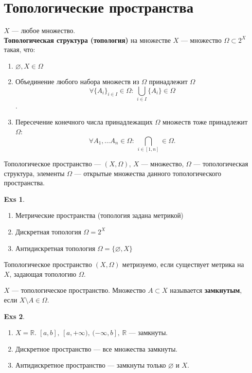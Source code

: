 \documentclass[11pt]{book}
\newcommand{\R}{\mathbb{R}}
\theoremstyle{definition}
\theoremstyle{plain}
\theoremstyle{plain}
\theoremstyle{definition}
\newtheorem*{exs}{Exs}
\theoremstyle{remark}
\begin{document}
\section{Топологические пространства}
\begin{defn}
    $ X$ --- любое множество. \\
    {\bf Топологическая структура (топология)} на множестве $ X$ --- множество  $ \Omega \subset 2^{X}$ такая, что:
    \begin{enumerate}
	\item $ \varnothing, X \in \Omega $
	\item Объединение любого набора множеств из $ \Omega $ принадлежит $ \Omega $
	    $$ \forall \{A_i\}_{i \in I} \in  \Omega : ~ \bigcup_{i \in  I}\{A_i\} \in \Omega  $$.
	\item Пересечение конечного числа принадлежащих $ \Omega $ множеств тоже принадлежит $ \Omega $:
	    \[
		\forall A_1, \ldots A_n \in \Omega : ~ \bigcap_{i \in [1, n]} \in \Omega
	    .\]
    \end{enumerate}
    Топологическое пространство --- $ (X, \Omega )$,
    $ X $ --- множество,  $ \Omega $ --- топологическая структура, элементы $ \Omega $ --- открытые множества данного топологического пространства.
\end{defn}
\begin{exs}
    $ $
    \begin{enumerate}
	\item Метрические пространства (топология задана метрикой)
	\item Дискретная топология  $ \Omega = 2^{X}$
	\item Антидискретная  топология $ \Omega = \{\varnothing, X\}$
    \end{enumerate}
\end{exs}
\begin{defn}
    Топологическое пространство $ (X, \Omega )$ метризуемо, если существует метрика на $ X$, задающая топологию $ \Omega $.
\end{defn}
\begin{defn}
    $ X$ ---  топологическое пространство.
    Множество $ A \subset X$ называется {\bf замкнутым}, если $ X \setminus A \in \Omega $.
\end{defn}
\begin{exs}
    $ $
    \begin{enumerate}
	\item $ X = \R$.  $ [a, b], ~[a, +\infty), ~ (-\infty, b], ~\R$ --- замкнуты.
	\item Дискретное пространство --- все множества замкнуты.
	\item Антидискретное пространство --- замкнуты только  $ \varnothing$ и $ X$.
    \end{enumerate}
\end{exs}
\end{document}
